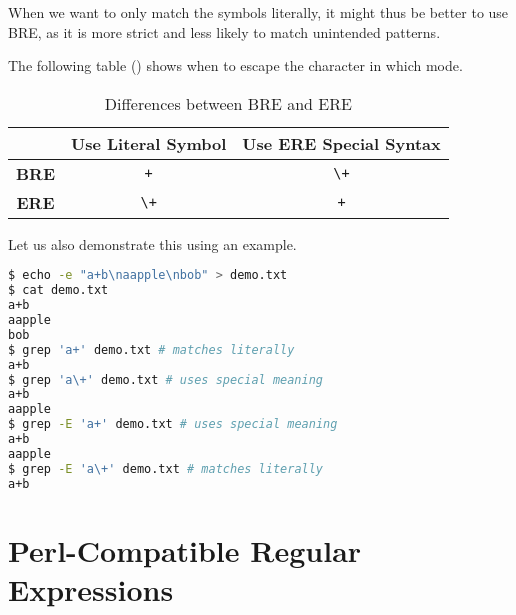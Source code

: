 When we want to only match the symbols literally, it might thus be better to use BRE, as it is more strict and less likely to match unintended patterns.

The following table () shows when to escape the character in which mode.

\begin{table*}[h!]
  \caption{Differences between BRE and ERE}
  \centering
  \begin{tabular}{c c c}
     & \textbf{Use Literal Symbol} & \textbf{Use ERE Special Syntax} \\
    \midrule
    \textbf{BRE} & \lstinline|+| & \lstinline|\+| \\
    \textbf{ERE} & \lstinline|\+| & \lstinline|+| \\
  \end{tabular}
\end{table*}

Let us also demonstrate this using an example.

\begin{lstlisting}[language=bash]
$ echo -e "a+b\naapple\nbob" > demo.txt
$ cat demo.txt
a+b
aapple
bob
$ grep 'a+' demo.txt # matches literally
a+b
$ grep 'a\+' demo.txt # uses special meaning
a+b
aapple
$ grep -E 'a+' demo.txt # uses special meaning
a+b
aapple
$ grep -E 'a\+' demo.txt # matches literally
a+b
\end{lstlisting}

\newpage
\section{Perl-Compatible Regular Expressions}

